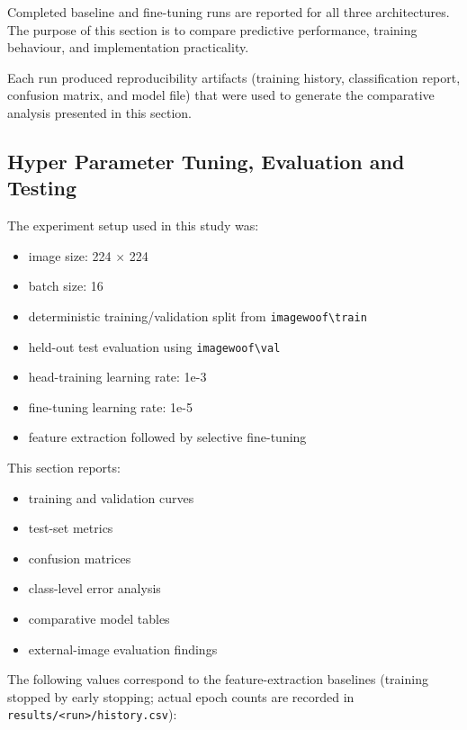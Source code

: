 \documentclass[12pt, a4paper]{article}
\begin{document}
Completed baseline and fine-tuning runs are reported for all three architectures. The purpose of this section is to compare predictive performance, training behaviour, and implementation practicality.

Each run produced reproducibility artifacts (training history, classification report, confusion matrix, and model file) that were used to generate the comparative analysis presented in this section.

\subsection{Hyper Parameter Tuning, Evaluation and Testing}

The experiment setup used in this study was:

\begin{itemize}
  \item image size: 224 $\times$ 224
  \item batch size: 16
  \item deterministic training/validation split from \texttt{imagewoof\textbackslash{}train}
  \item held-out test evaluation using \texttt{imagewoof\textbackslash{}val}
  \item head-training learning rate: 1e-3
  \item fine-tuning learning rate: 1e-5
  \item feature extraction followed by selective fine-tuning
\end{itemize}

This section reports:

\begin{itemize}
  \item training and validation curves
  \item test-set metrics
  \item confusion matrices
  \item class-level error analysis
  \item comparative model tables
  \item external-image evaluation findings
\end{itemize}

The following values correspond to the feature-extraction baselines (training stopped by early stopping; actual epoch counts are recorded in \texttt{results/\textless{}run\textgreater{}/history.csv}):
\end{document}
